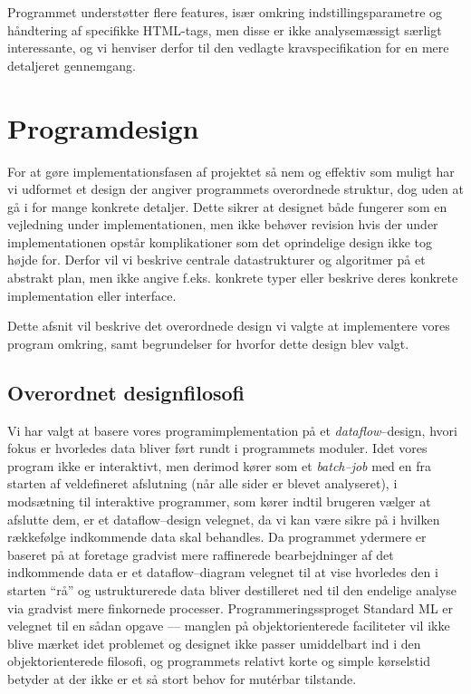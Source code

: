 \documentclass[a4paper,oneside]{memoir}
\begin{document}
Programmet understøtter flere features, især omkring
indstillingsparametre og håndtering af specifikke HTML-tags, men disse
er ikke analysemæssigt særligt interessante, og vi henviser derfor til
den vedlagte kravspecifikation for en mere detaljeret gennemgang.

\chapter{Programdesign}

For at gøre implementationsfasen af projektet så nem og effektiv som
muligt har vi udformet et design der angiver programmets overordnede
struktur, dog uden at gå i for mange konkrete detaljer. Dette sikrer
at designet både fungerer som en vejledning under implementationen,
men ikke behøver revision hvis der under implementationen opstår
komplikationer som det oprindelige design ikke tog højde for. Derfor
vil vi beskrive centrale datastrukturer og algoritmer på et abstrakt
plan, men ikke angive f.eks. konkrete typer eller beskrive deres
konkrete implementation eller interface.

Dette afsnit vil beskrive det overordnede design vi valgte at
implementere vores program omkring, samt begrundelser for hvorfor
dette design blev valgt.

\section{Overordnet designfilosofi}
\label{overordnetdesign}
Vi har valgt at basere vores programimplementation på et
\textit{dataflow}--design, hvori fokus er hvorledes data bliver ført
rundt i programmets moduler. Idet vores program ikke er interaktivt,
men derimod kører som et \textit{batch--job} med en fra starten af
veldefineret afslutning (når alle sider er blevet analyseret), i
modsætning til interaktive programmer, som kører indtil brugeren
vælger at afslutte dem, er et dataflow--design velegnet, da vi kan
være sikre på i hvilken rækkefølge indkommende data skal behandles. Da
programmet ydermere er baseret på at foretage gradvist mere
raffinerede bearbejdninger af det indkommende data er et
dataflow--diagram velegnet til at vise hvorledes den i starten ``rå''
og ustrukturerede data bliver destilleret ned til den endelige analyse
via gradvist mere finkornede processer. Programmeringssproget Standard
ML er velegnet til en sådan opgave --- manglen på objektorienterede
faciliteter vil ikke blive mærket idet problemet og designet ikke
passer umiddelbart ind i den objektorienterede filosofi, og
programmets relativt korte og simple kørselstid betyder at der ikke er
et så stort behov for mutérbar tilstande. 
\end{document}
